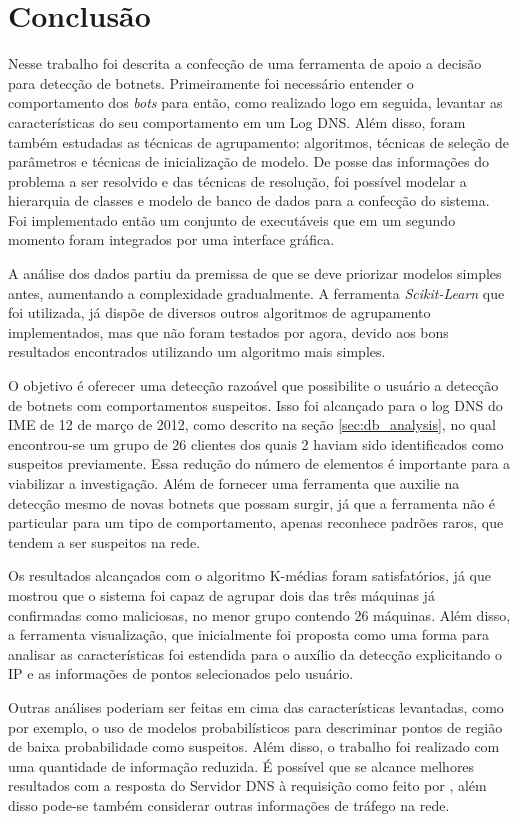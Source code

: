 \chapter{Conclusão}

Nesse trabalho foi descrita a confecção de uma ferramenta de apoio a decisão para detecção de botnets. Primeiramente foi necessário entender o comportamento dos \textit{bots} para então, como realizado logo em seguida, levantar as características do seu comportamento em um Log DNS. Além disso, foram também estudadas as técnicas de agrupamento: algoritmos, técnicas de seleção de parâmetros e técnicas de inicialização de modelo. De posse das informações do problema a ser resolvido e das técnicas de resolução, foi possível modelar a hierarquia de classes e modelo de banco de dados para a confecção do sistema. Foi implementado então um conjunto de executáveis que em um segundo momento foram integrados por uma interface gráfica.

A análise dos dados partiu da premissa de que se deve priorizar modelos simples antes, aumentando a complexidade gradualmente. A ferramenta \textit{Scikit-Learn} que foi utilizada, já dispõe de diversos outros algoritmos de agrupamento implementados, mas que não foram testados por agora, devido aos bons resultados encontrados utilizando um algoritmo mais simples.

O objetivo é oferecer uma detecção razoável que possibilite o usuário a detecção de botnets com comportamentos suspeitos. Isso foi alcançado para o log DNS do IME de 12 de março de 2012, como descrito na seção \ref{sec:db_analysis}, no qual encontrou-se um grupo de 26 clientes dos quais 2 haviam sido identificados como suspeitos previamente. Essa redução do número de elementos é importante para a viabilizar a investigação. Além de fornecer uma ferramenta que auxilie na detecção mesmo de novas botnets que possam surgir, já que a ferramenta não é particular para um tipo de comportamento, apenas reconhece padrões raros, que tendem a ser suspeitos na rede.

Os resultados alcançados com o algoritmo K-médias foram satisfatórios, já que mostrou que o sistema foi capaz de agrupar dois das três máquinas já confirmadas como maliciosas, no menor grupo contendo 26 máquinas. Além disso, a ferramenta visualização, que inicialmente foi proposta como uma forma para analisar as características foi estendida para o auxílio da detecção explicitando o IP e as informações de pontos selecionados pelo usuário.

Outras análises poderiam ser feitas em cima das características levantadas, como por exemplo, o uso de modelos probabilísticos para descriminar pontos de região de baixa probabilidade como suspeitos. Além disso, o trabalho foi realizado com uma quantidade de informação reduzida. É possível que se alcance melhores resultados com a resposta do Servidor DNS à requisição como feito por \citet{schonewille2006domain}, além disso pode-se também considerar outras informações de tráfego na rede.	